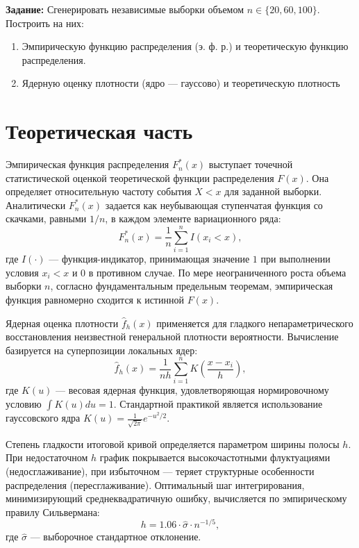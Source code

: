 \documentclass[a4paper, 14pt]{extarticle}
\begin{document}
\textbf{Задание:}
Сгенерировать независимые выборки объемом $n \in \{20, 60, 100\}$. Построить на них:
\begin{enumerate}
    \item Эмпирическую функцию распределения (э. ф. р.) и теоретическую функцию распределения.
    \item Ядерную оценку плотности (ядро — гауссово) и теоретическую плотность
\end{enumerate}

\section{Теоретическая часть}

Эмпирическая функция распределения $F_n^*(x)$ выступает точечной статистической оценкой теоретической функции распределения $F(x)$. Она определяет относительную частоту события $X < x$ для заданной выборки. Аналитически $F_n^*(x)$ задается как неубывающая ступенчатая функция со скачками, равными $1/n$, в каждом элементе вариационного ряда:
\begin{equation}
    F_n^*(x) = \frac{1}{n} \sum_{i=1}^n I(x_i < x),
\end{equation}
где $I(\cdot)$ — функция-индикатор, принимающая значение $1$ при выполнении условия $x_i < x$ и $0$ в противном случае. По мере неограниченного роста объема выборки $n$, согласно фундаментальным предельным теоремам, эмпирическая функция равномерно сходится к истинной $F(x)$.

Ядерная оценка плотности $\hat{f}_h(x)$ применяется для гладкого непараметрического восстановления неизвестной генеральной плотности вероятности. Вычисление базируется на суперпозиции локальных ядер:
\begin{equation}
    \hat{f}_h(x) = \frac{1}{nh} \sum_{i=1}^n K\left(\frac{x - x_i}{h}\right),
\end{equation}
где $K(u)$ — весовая ядерная функция, удовлетворяющая нормировочному условию $\int K(u) du = 1$. Стандартной практикой является использование гауссовского ядра $K(u) = \frac{1}{\sqrt{2\pi}} e^{-u^2/2}$.

Степень гладкости итоговой кривой определяется параметром ширины полосы $h$. При недостаточном $h$ график покрывается высокочастотными флуктуациями (недосглаживание), при избыточном — теряет структурные особенности распределения (пересглаживание). Оптимальный шаг интегрирования, минимизирующий среднеквадратичную ошибку, вычисляется по эмпирическому правилу Сильвермана:
\begin{equation}
    h = 1.06 \cdot \hat{\sigma} \cdot n^{-1/5},
\end{equation}
где $\hat{\sigma}$ — выборочное стандартное отклонение. 
\end{document}

